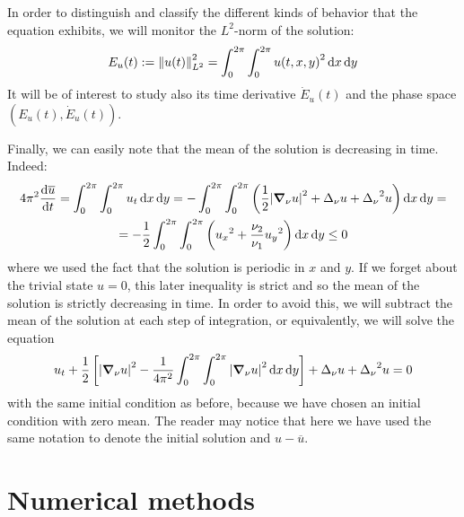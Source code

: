 \documentclass[twoside]{article}
\begin{document}
In order to distinguish and classify the different kinds of behavior that the equation exhibits, we will monitor the $L^2$-norm of the solution:
\begin{equation}
  E_u(t):=\left\|u(t)\right\|_{L^2}^2 = \int_0^{2\pi} \int_0^{2\pi} {u(t,x,y)}^2 \dd{x} \dd{y}
\end{equation}
It will be of interest to study also its time derivative $\dot{E}_u(t)$ and the phase space $(E_u(t), \dot{E}_u(t))$.

Finally, we can easily note that the mean of the solution is decreasing in time. Indeed:
\begin{multline}
  4\pi^2\dv{\overline{u}}{t}= \int_0^{2\pi} \int_0^{2\pi} u_t \dd{x} \dd{y} = -\int_0^{2\pi} \int_0^{2\pi} \left( \frac{1}{2} \abs{\grad_\nu u}^2 + \Delta_\nu u + {\Delta_\nu}^2 u \right) \dd{x} \dd{y} =\\= -\frac{1}{2}\int_0^{2\pi} \int_0^{2\pi} \left({u_x}^2 + \frac{\nu_2}{\nu_1} {u_y}^2\right) \dd{x} \dd{y} \leq 0
\end{multline}
where we used the fact that the solution is periodic in $x$ and $y$. If we forget about the trivial state $u=0$, this later inequality is strict and so the mean of the solution is strictly decreasing in time. In order to avoid this, we will subtract the mean of the solution at each step of integration, or equivalently, we will solve the equation
\begin{equation}
  u_t + \frac{1}{2} \left[\abs{\grad_\nu u}^2 - \frac{1}{4\pi^2}\int_0^{2\pi} \int_0^{2\pi} \abs{\grad_\nu u}^2 \dd{x} \dd{y} \right] + \Delta_\nu u + {\Delta_\nu}^2 u = 0
\end{equation}
with the same initial condition as before, because we have chosen an initial condition with zero mean. The reader may notice that here we have used the same notation to denote the initial solution and $u-\overline{u}$.
\section{Numerical methods}
\end{document}
